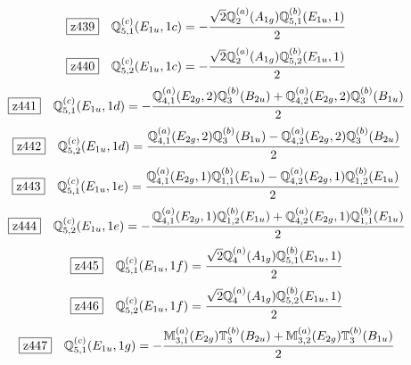 \documentclass[fleqn,10pt,landscape]{jsarticle}
\begin{document}
\begin{dmath*}
\hspace*{3mm}\fbox{z439}\quad \mathbb{Q}_{5,1}^{(c)}(E_{1u},1c)=- \frac{\sqrt{2} \mathbb{Q}_{2}^{(a)}(A_{1g}) \mathbb{Q}_{5,1}^{(b)}(E_{1u},1)}{2}
\end{dmath*}
\begin{dmath*}
\hspace*{3mm}\fbox{z440}\quad \mathbb{Q}_{5,2}^{(c)}(E_{1u},1c)=- \frac{\sqrt{2} \mathbb{Q}_{2}^{(a)}(A_{1g}) \mathbb{Q}_{5,2}^{(b)}(E_{1u},1)}{2}
\end{dmath*}
\begin{dmath*}
\hspace*{3mm}\fbox{z441}\quad \mathbb{Q}_{5,1}^{(c)}(E_{1u},1d)=- \frac{\mathbb{Q}_{4,1}^{(a)}(E_{2g},2) \mathbb{Q}_{3}^{(b)}(B_{2u}) + \mathbb{Q}_{4,2}^{(a)}(E_{2g},2) \mathbb{Q}_{3}^{(b)}(B_{1u})}{2}
\end{dmath*}
\begin{dmath*}
\hspace*{3mm}\fbox{z442}\quad \mathbb{Q}_{5,2}^{(c)}(E_{1u},1d)=\frac{\mathbb{Q}_{4,1}^{(a)}(E_{2g},2) \mathbb{Q}_{3}^{(b)}(B_{1u}) - \mathbb{Q}_{4,2}^{(a)}(E_{2g},2) \mathbb{Q}_{3}^{(b)}(B_{2u})}{2}
\end{dmath*}
\begin{dmath*}
\hspace*{3mm}\fbox{z443}\quad \mathbb{Q}_{5,1}^{(c)}(E_{1u},1e)=\frac{\mathbb{Q}_{4,1}^{(a)}(E_{2g},1) \mathbb{Q}_{1,1}^{(b)}(E_{1u}) - \mathbb{Q}_{4,2}^{(a)}(E_{2g},1) \mathbb{Q}_{1,2}^{(b)}(E_{1u})}{2}
\end{dmath*}
\begin{dmath*}
\hspace*{3mm}\fbox{z444}\quad \mathbb{Q}_{5,2}^{(c)}(E_{1u},1e)=- \frac{\mathbb{Q}_{4,1}^{(a)}(E_{2g},1) \mathbb{Q}_{1,2}^{(b)}(E_{1u}) + \mathbb{Q}_{4,2}^{(a)}(E_{2g},1) \mathbb{Q}_{1,1}^{(b)}(E_{1u})}{2}
\end{dmath*}
\begin{dmath*}
\hspace*{3mm}\fbox{z445}\quad \mathbb{Q}_{5,1}^{(c)}(E_{1u},1f)=\frac{\sqrt{2} \mathbb{Q}_{4}^{(a)}(A_{1g}) \mathbb{Q}_{5,1}^{(b)}(E_{1u},1)}{2}
\end{dmath*}
\begin{dmath*}
\hspace*{3mm}\fbox{z446}\quad \mathbb{Q}_{5,2}^{(c)}(E_{1u},1f)=\frac{\sqrt{2} \mathbb{Q}_{4}^{(a)}(A_{1g}) \mathbb{Q}_{5,2}^{(b)}(E_{1u},1)}{2}
\end{dmath*}
\begin{dmath*}
\hspace*{3mm}\fbox{z447}\quad \mathbb{Q}_{5,1}^{(c)}(E_{1u},1g)=- \frac{\mathbb{M}_{3,1}^{(a)}(E_{2g}) \mathbb{T}_{3}^{(b)}(B_{2u}) + \mathbb{M}_{3,2}^{(a)}(E_{2g}) \mathbb{T}_{3}^{(b)}(B_{1u})}{2}
\end{dmath*}
\end{document}
